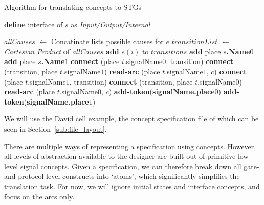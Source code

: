 \documentclass[british,conference,compsoc]{IEEEtran}
\begin{document}
\begin{algorithm}[t]
\begin{algorithmic}
\caption{Algorithm for translating concepts to STGs\label{alg:translation}}
  \State \textbf{define} interface of $s$ as \emph{Input/Output/Internal}
\EndFor

  \State $allCauses$ $\leftarrow$ Concatinate lists  possible causes for $e$
  \State $transitionList$ $\leftarrow$ \emph{Cartesian Product} \textbf{of} 
	$allCauses$
    \State \textbf{add} $e(i)$ to $transitions$
  \EndFor 
\EndFor
{}
  \State \textbf{add} place \textbf{$s$.Name}$0$
  \State \textbf{add} place \textbf{$s$.Name}$1$
\EndFor
{}
    \State \textbf{connect} (place $t$.signalName$0$, transition)
    \State \textbf{connect} (transition, place $t$.signalName$1$)
      \State \textbf{read-arc} (place $t$.signalName$1$, $c$)
    \EndFor
  \EndIf
    \State \textbf{connect} (place $t$.signalName$1$, transition)
    \State \textbf{connect} (transition, place $t$.signalName$0$)
      \State \textbf{read-arc} (place $t$.signalName$0$, $c$)
    \EndFor
  \EndIf
\EndFor
{}
    \State \textbf{add-token}(\textbf{signalName.place}$0$)
  \EndIf 
    \State \textbf{add-token}(\textbf{signalName.place}$1$)
  \EndIf
\EndFor
\end{algorithmic}
\end{algorithm}

We will use the David cell example, the concept specification file of which can 
be seen in Section~\ref{sub:file_layout}. 

There are multiple ways of representing a specification using concepts. However,
all levels of abstraction available to the designer are built out of primitive 
low-level signal concepts. Given a specification, we can therefore break down 
all gate- and protocol-level constructs into `atoms', which significantly 
simplifies the translation task. For now, we will ignore initial states and interface
concepts, and focus on the arcs only.
\end{document}
